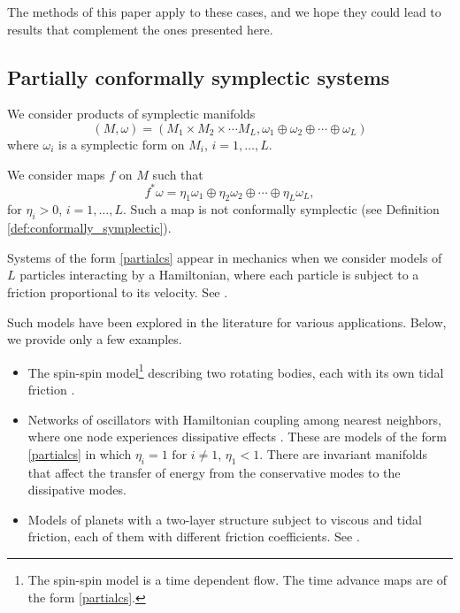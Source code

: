 \documentclass[11pt]{amsart}
\theoremstyle{definition}
\theoremstyle{remark}
\numberwithin{equation}{section}
\begin{document}
The methods of this paper apply to these cases,
and we hope they could lead to results that complement the ones presented here.



\subsection{Partially conformally symplectic systems}
\label{partially}

We consider products of symplectic manifolds
\[
(M,\omega) =
(M_1 \times M_2 \times \cdots M_L, \omega_1 \oplus \omega_2 \oplus
\cdots \oplus \omega_L)
\]
where $\omega_i$ is a symplectic form  on $M_i$, $i=1,\ldots, L$.

We consider maps $f$ on $M$ such that
\begin{equation}\label{partialcs}
f^* \omega = \eta_1 \omega_1 \oplus \eta_2 \omega_2
\oplus  \cdots \oplus \eta_L \omega_L,
\end{equation}
for $\eta_i>0$, $i=1,\ldots, L$. Such a map is not conformally symplectic (see Definition \ref{def:conformally_symplectic}).

Systems of the form \eqref{partialcs} appear in mechanics when we consider models of
$L$ particles interacting by a Hamiltonian, where each particle is subject to
  a friction  proportional to its velocity.
See \cite[Remark 3]{CallejaCL13}.

Such models have been explored in the literature for various applications. Below, we provide only a few examples.


\begin{itemize}
\item
  The spin-spin model\footnote{The spin-spin model
is a time dependent flow. The time advance maps are of the form \eqref{partialcs}.} describing two
rotating bodies, each with its own tidal friction
\cite[eq. (42)]{Misquero21}.
\item
Networks of oscillators with Hamiltonian coupling among nearest neighbors, where one node experiences dissipative effects
\cite{EckmannW20,EckmanW18,CuneoEW17,DolgopyatFKY2025}.
These are models of the form \eqref{partialcs}
in which $\eta_i = 1 \textrm{ for  } i \ne 1$, $\eta_1 < 1$.
There are invariant manifolds that affect the transfer of energy
from the conservative modes to the dissipative modes.
\item
Models of planets with a two-layer  structure
subject to viscous and tidal friction, each of them
with different friction coefficients. See \cite{PinzariSV24}.
\end{itemize}
\end{document}
